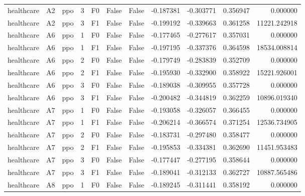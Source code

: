 \begin{tabular}{lllrlllrrrr}
healthcare &      A2 &       ppo &     3 &  F0 &           False &            False & -0.187381 & -0.303771 & 0.356947 &         0.000000 \\
healthcare &      A2 &       ppo &     3 &  F1 &           False &            False & -0.199192 & -0.339663 & 0.361258 &     11221.242918 \\
healthcare &      A6 &       ppo &     1 &  F0 &           False &            False & -0.177465 & -0.277617 & 0.357031 &         0.000000 \\
healthcare &      A6 &       ppo &     1 &  F1 &           False &            False & -0.197195 & -0.337376 & 0.364598 &     18534.008814 \\
healthcare &      A6 &       ppo &     2 &  F0 &           False &            False & -0.179749 & -0.283839 & 0.352709 &         0.000000 \\
healthcare &      A6 &       ppo &     2 &  F1 &           False &            False & -0.195930 & -0.332900 & 0.358922 &     15221.926001 \\
healthcare &      A6 &       ppo &     3 &  F0 &           False &            False & -0.189038 & -0.309955 & 0.357728 &         0.000000 \\
healthcare &      A6 &       ppo &     3 &  F1 &           False &            False & -0.200482 & -0.344819 & 0.362259 &     10896.019340 \\
healthcare &      A7 &       ppo &     1 &  F0 &           False &            False & -0.193058 & -0.326057 & 0.366455 &         0.000000 \\
healthcare &      A7 &       ppo &     1 &  F1 &           False &            False & -0.206214 & -0.366574 & 0.371254 &     12536.734905 \\
healthcare &      A7 &       ppo &     2 &  F0 &           False &            False & -0.183731 & -0.297480 & 0.358477 &         0.000000 \\
healthcare &      A7 &       ppo &     2 &  F1 &           False &            False & -0.195853 & -0.334381 & 0.362690 &     11451.953483 \\
healthcare &      A7 &       ppo &     3 &  F0 &           False &            False & -0.177447 & -0.277195 & 0.358644 &         0.000000 \\
healthcare &      A7 &       ppo &     3 &  F1 &           False &            False & -0.189041 & -0.312133 & 0.362727 &     10887.565486 \\
healthcare &      A8 &       ppo &     1 &  F0 &           False &            False & -0.189245 & -0.311441 & 0.358192 &         0.000000 \\

\end{tabular}
